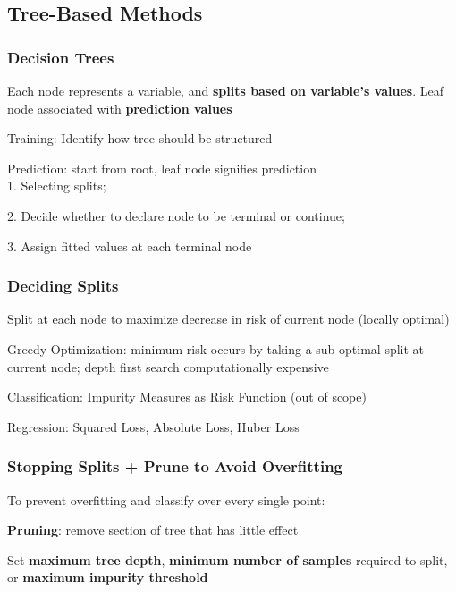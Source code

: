 \documentclass[8pt]{extarticle}
\begin{document}
\subsection*{Tree-Based Methods}
\subsubsection*{Decision Trees}
Each node represents a variable, and \textbf{splits based on variable’s values}. Leaf node associated with \textbf{prediction values} \par
Training: Identify how tree should be structured \par
Prediction: start from root, leaf node signifies prediction \\

1. Selecting splits; \par
2. Decide whether to declare node to be terminal or continue; \par
3. Assign fitted values at each terminal node

\subsubsection*{Deciding Splits}
Split at each node to maximize decrease in risk of current node (locally optimal) \par
Greedy Optimization: minimum risk occurs by taking a sub-optimal split at current node; depth first search computationally expensive \par
Classification: Impurity Measures as Risk Function (out of scope) \par
Regression: Squared Loss, Absolute Loss, Huber Loss \par

\subsubsection*{Stopping Splits + Prune to Avoid Overfitting}
To prevent overfitting and classify over every single point: \par
\textbf{Pruning}: remove section of tree that has little effect \par
Set \textbf{maximum tree depth}, \textbf{minimum number of samples} required to split, or \textbf{maximum impurity threshold}\\
\end{document}
